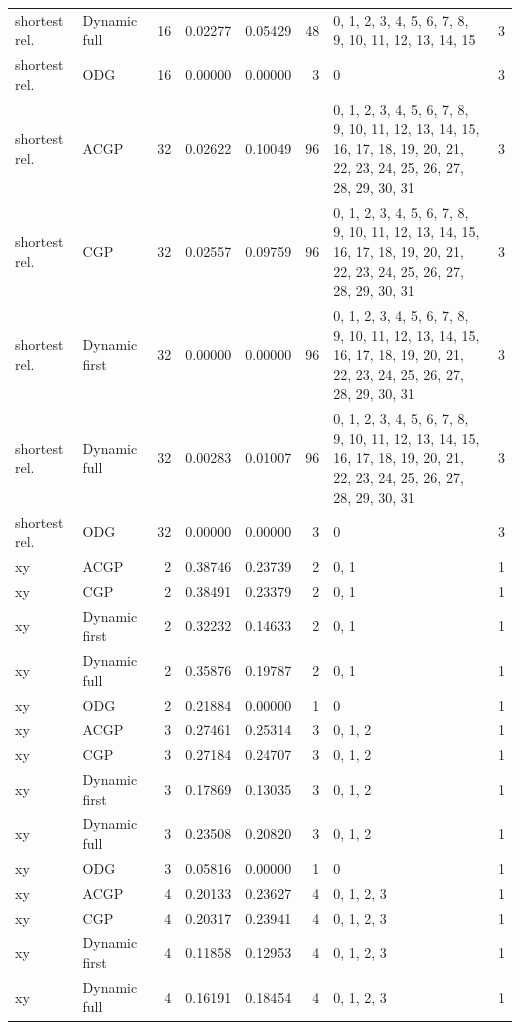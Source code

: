 \documentclass[10pt,a4paper]{article}
\begin{document}
\begin{longtable}{@{}p{23mm}p{29mm}rrrrp{36mm}r@{}}
shortest rel. & Dynamic full & 16 & 0.02277 & 0.05429 & 48 & 0, 1, 2, 3, 4, 5, 6, 7, 8, 9, 10, 11, 12, 13, 14, 15 & 3 \\
shortest rel. & ODG & 16 & 0.00000 & 0.00000 & 3 & 0 & 3 \\
shortest rel. & ACGP & 32 & 0.02622 & 0.10049 & 96 & 0, 1, 2, 3, 4, 5, 6, 7, 8, 9, 10, 11, 12, 13, 14, 15, 16, 17, 18, 19, 20, 21, 22, 23, 24, 25, 26, 27, 28, 29, 30, 31 & 3 \\
shortest rel. & CGP & 32 & 0.02557 & 0.09759 & 96 & 0, 1, 2, 3, 4, 5, 6, 7, 8, 9, 10, 11, 12, 13, 14, 15, 16, 17, 18, 19, 20, 21, 22, 23, 24, 25, 26, 27, 28, 29, 30, 31 & 3 \\
shortest rel. & Dynamic first & 32 & 0.00000 & 0.00000 & 96 & 0, 1, 2, 3, 4, 5, 6, 7, 8, 9, 10, 11, 12, 13, 14, 15, 16, 17, 18, 19, 20, 21, 22, 23, 24, 25, 26, 27, 28, 29, 30, 31 & 3 \\
shortest rel. & Dynamic full & 32 & 0.00283 & 0.01007 & 96 & 0, 1, 2, 3, 4, 5, 6, 7, 8, 9, 10, 11, 12, 13, 14, 15, 16, 17, 18, 19, 20, 21, 22, 23, 24, 25, 26, 27, 28, 29, 30, 31 & 3 \\
shortest rel. & ODG & 32 & 0.00000 & 0.00000 & 3 & 0 & 3 \\
xy & ACGP & 2 & 0.38746 & 0.23739 & 2 & 0, 1 & 1 \\
xy & CGP & 2 & 0.38491 & 0.23379 & 2 & 0, 1 & 1 \\
xy & Dynamic first & 2 & 0.32232 & 0.14633 & 2 & 0, 1 & 1 \\
xy & Dynamic full & 2 & 0.35876 & 0.19787 & 2 & 0, 1 & 1 \\
xy & ODG & 2 & 0.21884 & 0.00000 & 1 & 0 & 1 \\
xy & ACGP & 3 & 0.27461 & 0.25314 & 3 & 0, 1, 2 & 1 \\
xy & CGP & 3 & 0.27184 & 0.24707 & 3 & 0, 1, 2 & 1 \\
xy & Dynamic first & 3 & 0.17869 & 0.13035 & 3 & 0, 1, 2 & 1 \\
xy & Dynamic full & 3 & 0.23508 & 0.20820 & 3 & 0, 1, 2 & 1 \\
xy & ODG & 3 & 0.05816 & 0.00000 & 1 & 0 & 1 \\
xy & ACGP & 4 & 0.20133 & 0.23627 & 4 & 0, 1, 2, 3 & 1 \\
xy & CGP & 4 & 0.20317 & 0.23941 & 4 & 0, 1, 2, 3 & 1 \\
xy & Dynamic first & 4 & 0.11858 & 0.12953 & 4 & 0, 1, 2, 3 & 1 \\
xy & Dynamic full & 4 & 0.16191 & 0.18454 & 4 & 0, 1, 2, 3 & 1 \\

\end{longtable}
\end{document}

